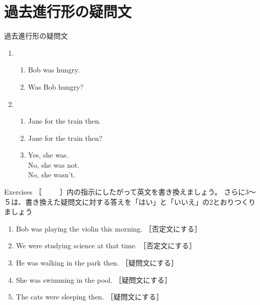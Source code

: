 \documentclass[aspectratio=169,xcolor={dvipsnames,table}]{beamer}
\begin{document}
\section{過去進行形の疑問文}
\begin{frame}[plain]{過去進行形の疑問文}
  \begin{enumerate}
  \item \begin{enumerate}
	 \item<1-> Bob was hungry.
	 \item<2-> Was Bob hungry?
	\end{enumerate}
  \item \begin{enumerate}
	 \item<3-> Jane  for the train then.
	 \item<4->  Jane  for the train then?
	 \item<5-> Yes, she was.\\
                   No, she was not.\\
                   No, she wasn't.
	\end{enumerate}

 \end{enumerate}
\hfill{}

\end{frame}
\begin{frame}[plain]{Exercises}
 ［~~~~~］内の指示にしたがって英文を書き換えましょう。
さらに3～５は、書き換えた疑問文に対する答えを「はい」と「いいえ」の2とおりつくりましょう\hfill{}

\begin{enumerate}
 \item Bob was playing the violin this morning. ［否定文にする］\\
 \item We were studying science at that time. ［否定文にする］\\
 \item He was walking in the park then. ［疑問文にする］\\
 \item She was swimming in the pool. ［疑問文にする］\\
 \item The cats were sleeping then. ［疑問文にする］\\

\end{enumerate}

\end{frame}
\end{document}
